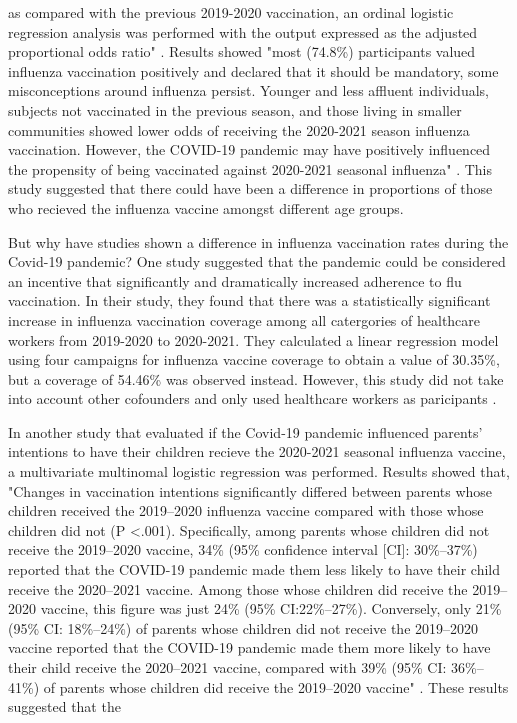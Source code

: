 \documentclass[12pt]{article}
\begin{document}
as compared with the previous 2019-2020 vaccination, an ordinal logistic regression analysis was performed with the output expressed as the adjusted proportional odds ratio" \citep{domnich2020attitudes}. Results showed "most (74.8\%) participants valued 
influenza vaccination positively and declared that it should be mandatory, some misconceptions around influenza persist. Younger and less affluent individuals, subjects not vaccinated in the previous season, and those living in smaller communities showed lower 
odds of receiving the 2020-2021 season influenza vaccination. However, the COVID-19 pandemic may have positively influenced the propensity of being vaccinated against 2020-2021 seasonal influenza" \citep{domnich2020attitudes}. This study suggested that there could have 
been a difference in proportions of those who recieved the influenza vaccine amongst different age groups. \par
But why have studies shown a difference in influenza vaccination rates during the Covid-19 pandemic?  One study suggested that the pandemic could be considered an incentive that significantly and dramatically increased adherence to flu vaccination. In their study, they found
that there was a statistically significant increase in influenza vaccination coverage among all catergories of healthcare workers from 2019-2020 to 2020-2021. They calculated a linear regression model using four campaigns for influenza vaccine coverage to obtain a value of 30.35\%, but
a coverage of 54.46\% was observed instead. However, this study did not take into account other cofounders and only used healthcare workers as paricipants \citep{di2021covid}. \par
In another study that evaluated if the Covid-19 pandemic influenced parents' intentions to have their children recieve the 2020-2021 seasonal influenza vaccine, a multivariate multinomal logistic regression was performed. Results showed that, "Changes in vaccination intentions significantly
differed between parents whose children received the 2019–2020 influenza vaccine compared with those whose children did not (P <.001). Specifically, among parents whose children did not receive the 2019–2020 vaccine, 34\% (95\% confidence interval [CI]: 30\%–37\%) reported that the COVID-19
pandemic made them less likely to have their child receive the 2020–2021 vaccine. Among those whose children did receive the 2019–2020 vaccine, this figure was just 24\% (95\% CI:22\%–27\%). Conversely, only 21\% (95\% CI: 18\%–24\%) of parents whose children did not
receive the 2019–2020 vaccine reported that the COVID-19 pandemic made them more likely to have their child receive the 2020–2021 vaccine, compared with 39\% (95\% CI: 36\%–41\%) of parents whose children did receive the 2019–2020 vaccine" \citep{sokol2020covid}. These results suggested that the 
\end{document}
